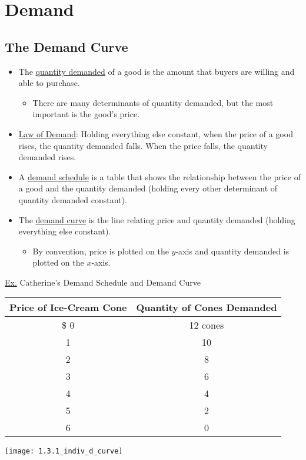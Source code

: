 \section{Demand}

\subsection{The Demand Curve}

	\begin{itemize}

	\item The \underline{quantity demanded} of a good is the amount that buyers are willing and able to purchase.
	
		\begin{itemize}
		
		\item There are many determinants of quantity demanded, but the most important is the good's price.
		
		\end{itemize}
		
	\item \underline{Law of Demand}: Holding everything else constant, when the price of a good rises, the quantity demanded falls. When the price falls, the quantity demanded rises.
	
	\item A \underline{demand schedule} is a table that shows the relationship between the price of a good and the quantity demanded (holding every other determinant of quantity demanded constant).
	
	\item The \underline{demand curve} is the line relating price and quantity demanded (holding everything else constant).
	
		\begin{itemize}
		
		\item By convention, price is plotted on the $y$-axis and quantity demanded is plotted on the $x$-axis.
		
		\end{itemize}

	\end{itemize}
	
	\underline{Ex.} Catherine's Demand Schedule and Demand Curve
	
	\begin{center}
	\begin{tabular}{ c | c }
	Price of Ice-Cream Cone & Quantity of Cones Demanded \\
	\hline
	\$ 0 & 12 cones \\
	1 & 10 \\
	2 & 8 \\
	3 & 6 \\
	4 & 4 \\
	5 & 2 \\
	6 & 0
	\end{tabular}
	
	\vspace{5mm}
	
	\texttt{[image: 1.3.1\_indiv\_d\_curve]}
	\end{center}
	
